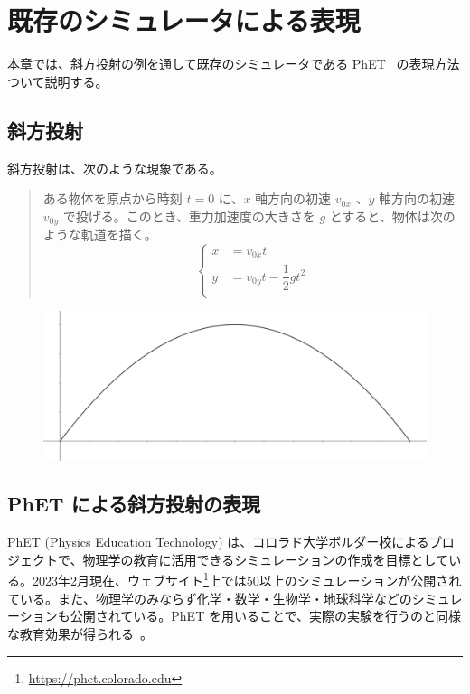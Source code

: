 \chapter{既存のシミュレータによる表現} \label{background}

本章では、斜方投射の例を通して既存のシミュレータである PhET~\cite{perkins_phet_2006} の表現方法ついて説明する。

\section{斜方投射}
斜方投射は、次のような現象である。
\begin{quote}
ある物体を原点から時刻 $t=0$ に、$x$ 軸方向の初速 $v_{0x}$ 、$y$ 軸方向の初速 $v_{0y}$ で投げる。このとき、重力加速度の大きさを $g$ とすると、物体は次のような軌道を描く。
\begin{equation}
\left\{
\begin{aligned}
  x &= v_{0x} t \\
  y &= v_{0y} t - \dfrac{1}{2}gt^2 \\
\end{aligned}
\right.
\end{equation} \label{斜方投射連立}
\end{quote}

\begin{figure}[H]
\centering
\includegraphics[width=0.9\linewidth]{figure/curve.png}
\end{figure}

\section{PhET による斜方投射の表現}

PhET (Physics Education Technology) は、コロラド大学ボルダー校によるプロジェクトで、物理学の教育に活用できるシミュレーションの作成を目標としている。2023年2月現在、ウェブサイト\footnote{\url{https://phet.colorado.edu}}上では50以上のシミュレーションが公開されている。また、物理学のみならず化学・数学・生物学・地球科学などのシミュレーションも公開されている。PhET を用いることで、実際の実験を行うのと同様な教育効果が得られる~\cite{ajredini_real_2014}。

